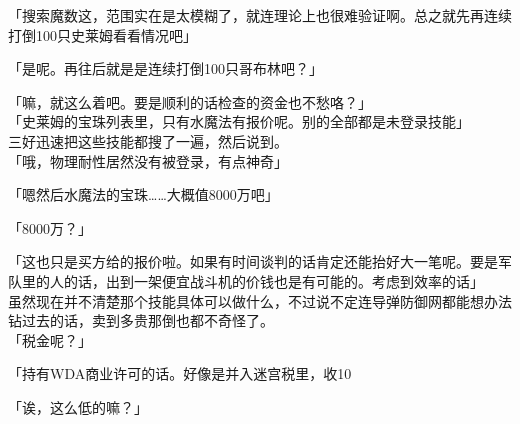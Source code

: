 「搜索魔数这，范围实在是太模糊了，就连理论上也很难验证啊。总之就先再连续打倒100只史莱姆看看情况吧」

「是呢。再往后就是是连续打倒100只哥布林吧？」

「嘛，就这么着吧。要是顺利的话检查的资金也不愁咯？」\\

「史莱姆的宝珠列表里，只有水魔法有报价呢。别的全部都是未登录技能」\\

三好迅速把这些技能都搜了一遍，然后说到。\\

「哦，物理耐性居然没有被登录，有点神奇」

「嗯然后水魔法的宝珠……大概值8000万吧」

「8000万？」

「这也只是买方给的报价啦。如果有时间谈判的话肯定还能抬好大一笔呢。要是军队里的人的话，出到一架便宜战斗机的价钱也是有可能的。考虑到效率的话」\\

虽然现在并不清楚那个技能具体可以做什么，不过说不定连导弹防御网都能想办法钻过去的话，卖到多贵那倒也都不奇怪了。\\

「税金呢？」

「持有WDA商业许可的话。好像是并入迷宫税里，收10%

「诶，这么低的嘛？」

